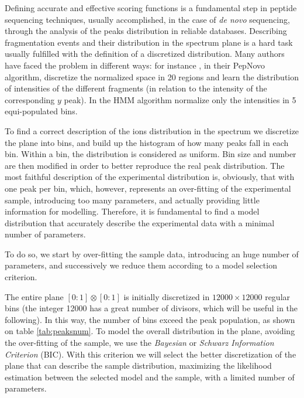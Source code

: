 Defining accurate and effective scoring functions is a fundamental step
in peptide sequencing techniques, usually accomplished, in the case of \emph{de
novo} sequencing, through the analysis of
the peaks distribution in reliable databases.
Describing fragmentation events and their distribution in the spectrum plane is
a hard task usually fulfilled with the definition of a discretized
distribution.
Many authors have faced the problem in different ways: for instance
\citet{pepnovo-analchem-2005}, in their PepNovo algorithm,
discretize the normalized space in 20 regions and learn the distribution of
intensities of the different fragments (in relation to the intensity of the
corresponding $y$ peak). In the HMM algorithm \citet{fischer2005novohmm}
normalize only the intensities in 5 equi-populated bins.

To find a correct description of the ions distribution in the spectrum we
discretize the plane into bins, and build up the histogram of how many peaks fall in each bin. Within a bin, the distribution is considered as uniform.
Bin size and number are then modified in order to better reproduce the real peak
distribution.
The most faithful description of the experimental distribution is, obviously, that with one peak per bin, 
which, however, represents an over-fitting of the experimental sample, introducing too
many parameters, and actually providing little information for modelling. 
Therefore, it is fundamental to find a model distribution that accurately describe the
experimental data with a minimal number of parameters.

To do so, we start by over-fitting the sample data, introducing an huge number of
parameters, and successively we reduce them according to a model selection
criterion.
 
The entire plane $[0:1]\otimes[0:1]$ is initially discretized in $12000\times12000$
regular bins (the integer 12000 has a great number of divisors, which will be useful in
the following). In this way, %
the number of bins 
exceed the peak population, as shown on table \ref{tab:peaksnum}. 
To model the overall distribution in the plane, avoiding the over-fitting of
the sample, we use the \emph{Bayesian} or \emph{Schwarz Information Criterion}
\cite{schwarz1978estimating}(BIC).
With this criterion we will select the better discretization of the plane that can
describe the sample distribution, maximizing the likelihood estimation between
the selected model and the sample, with a limited number of parameters.

